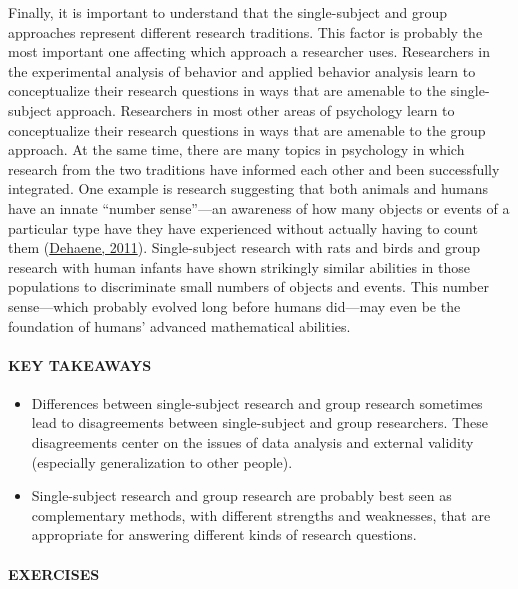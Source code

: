 \documentclass[
]{krantz}
\providecommand{\tightlist}{%
  \setlength{\itemsep}{0pt}\setlength{\parskip}{0pt}}
\begin{document}
Finally, it is important to understand that the single-subject and group approaches represent different research traditions. This factor is probably the most important one affecting which approach a researcher uses. Researchers in the experimental analysis of behavior and applied behavior analysis learn to conceptualize their research questions in ways that are amenable to the single-subject approach. Researchers in most other areas of psychology learn to conceptualize their research questions in ways that are amenable to the group approach. At the same time, there are many topics in psychology in which research from the two traditions have informed each other and been successfully integrated. One example is research suggesting that both animals and humans have an innate ``number sense''---an awareness of how many objects or events of a particular type have they have experienced without actually having to count them (\protect\hyperlink{ref-dehaene2011number}{Dehaene, 2011}). Single-subject research with rats and birds and group research with human infants have shown strikingly similar abilities in those populations to discriminate small numbers of objects and events. This number sense---which probably evolved long before humans did---may even be the foundation of humans' advanced mathematical abilities.

\hypertarget{key-takeaways-28}{%
\paragraph*{KEY TAKEAWAYS}\label{key-takeaways-28}}

\begin{itemize}
\tightlist
\item
  Differences between single-subject research and group research sometimes lead to disagreements between single-subject and group researchers. These disagreements center on the issues of data analysis and external validity (especially generalization to other people).
\item
  Single-subject research and group research are probably best seen as complementary methods, with different strengths and weaknesses, that are appropriate for answering different kinds of research questions.
\end{itemize}

\hypertarget{exercises-24}{%
\paragraph*{EXERCISES}\label{exercises-24}}
\end{document}
